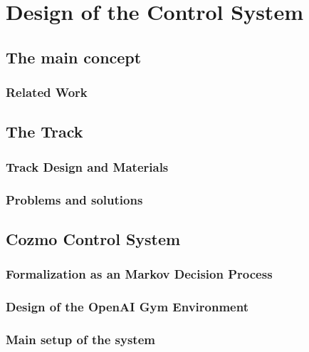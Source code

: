 \chapter{Design of the Control System}

\lipsum[10]

\section{The main concept}

\lipsum[10]

\subsection{Related Work}

\lipsum[10]

\section{The Track}

\lipsum[10]

\subsection{Track Design and Materials}

\lipsum[10]

\subsection{Problems and solutions}

\lipsum[10]

\section{Cozmo Control System}

\lipsum[10]

\subsection{Formalization as an Markov Decision Process}

\lipsum[10]

\subsection{Design of the OpenAI Gym Environment}

\lipsum[10]

\subsection{Main setup of the system}

\lipsum[10]